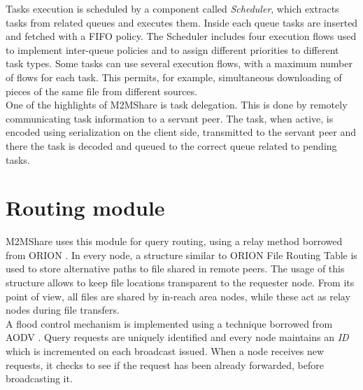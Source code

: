 Tasks execution is scheduled by a component called \textit{Scheduler}, which extracts tasks from related queues and executes them. Inside each queue tasks are inserted and fetched with a FIFO policy. The Scheduler includes four execution flows used to implement inter-queue policies and to assign different priorities to different task types. Some tasks can use several execution flows, with a maximum number of flows for each task. This permits, for example, simultaneous downloading of pieces of the same file from different sources.
\\

One of the highlights of M2MShare is task delegation. This is done by remotely communicating task information to a servant peer. The task, when active, is encoded using serialization on the client side, transmitted to the servant peer and there the task is decoded and queued to the correct queue related to pending tasks.



\section{Routing module}
M2MShare uses this module for query routing, using a relay method borrowed from ORION \cite{orion}. In every node, a structure similar to ORION File Routing Table is used to store alternative paths to file shared in remote peers. The usage of this structure allows to keep file locations transparent to the requester node. From its point of view, all files are shared by in-reach area nodes, while these act as relay nodes during file transfers.\\
A flood control mechanism is implemented using a technique borrowed from AODV \cite{aodv}. Query requests are uniquely identified and every node maintains an \textit{ID} which is incremented on each broadcast issued. When a node receives new requests, it checks to see if the request has been already forwarded, before broadcasting it.




